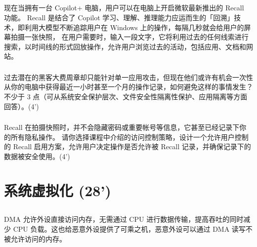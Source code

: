 \documentclass[a4paper,12pt]{article}
\newcommand{\score}[1]{(#1')}
\begin{document}
\begin{answer}
  \lipsum[3]
\end{answer}

\subsection{}

现在当拥有一台 Copilot+ 电脑，用户可以在电脑上开启微软最新推出的 Recall 功能。
Recall 是结合了 Copilot 学习、理解、推理能力应运而生的「回溯」技术，即利用大模型不断追踪用户在 Windows 上的操作，每隔几秒就会给用户的屏幕拍摄一张快照，
在用户需要时，输入一段文字，它将利用过去的任何线索进行搜索，以时间线的形式回放操作，允许用户浏览过去的活动，包括应用、文档和网站。

\subsubsection{}

过去潜在的黑客大费周章却只能针对单一应用攻击，但现在他们或许有机会一次性从你的电脑中获得最近一小时甚至一个月的操作记录，如何避免这样的事情发生？
不少于 3 点（可从系统安全保护层次、文件安全性隔离性保护、应用隔离等方面回答）。\score{4}

\begin{answer}
  \lipsum[3]
\end{answer}

\subsubsection{}

Recall 在拍摄快照时，并不会隐藏密码或重要帐号等信息，它甚至已经记录下你的所有隐私操作。
请你选择课程中介绍的访问控制策略，设计一个允许用户控制的 Recall 启用方案，允许用户决定操作是否允许被 Recall 记录，并确保记录下的数据被安全使用。\score{4}

\begin{answer}
  \lipsum[3]
\end{answer}

\section{系统虚拟化 \score{28}}

\subsection{}

DMA 允许外设直接访问内存，无需通过 CPU 进行数据传输，提高吞吐的同时减少 CPU 负载。这也给恶意外设提供了可乘之机，恶意外设可以通过 DMA 读写不被允许访问的内存。
\end{document}
